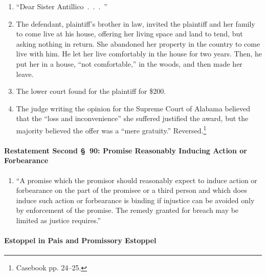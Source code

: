 \begin{enumerate}
    \item ``Dear Sister Antillico~.~.~.~''
    \item The defendant, plaintiff's brother in law, invited the plaintiff and 
    her family to come live at his house, offering her living space and land 
    to tend, but asking nothing in return. She abandoned her property in the 
    country to come live with him. He let her live comfortably in the house 
    for two years. Then, he put her in a house, ``not comfortable,'' in the 
    woods, and then made her leave.
    \item The lower court found for the plaintiff for \$200.
    \item The judge writing the opinion for the Supreme Court of Alabama 
    believed that the ``loss and inconvenience'' she suffered justified the 
    award, but the majority believed the offer was a ``mere gratuity.'' 
    Reversed.\footnote{Casebook pp. 24--25.}
\end{enumerate}

\paragraph{Restatement Second \S\ 90: Promise Reasonably Inducing Action or 
Forbearance}

\begin{enumerate}
    \item ``A promise which the promisor should reasonably expect to induce 
    action or forbearance on the part of the promisee or a third person and 
    which does induce such action or forbearance is binding if injustice can 
    be avoided only by enforcement of the promise. The remedy granted for 
    breach may be limited as justice requires.''
\end{enumerate}

\paragraph{Estoppel in Pais and Promissory Estoppel}

